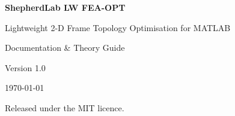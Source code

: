 \documentclass[11pt, a4paper]{report}
\begin{document}
\begin{titlepage}
    \centering
    \vspace*{3cm}
    {\Huge\bfseries ShepherdLab LW FEA-OPT\par}
    \vspace{0.5cm}
    {\Large Lightweight 2-D Frame Topology Optimisation for MATLAB\par}
    \vspace{2cm}
    {\large Documentation \& Theory Guide\par}
    \vspace{1cm}
    {\large Version 1.0\par}
    \vspace{3cm}
    {\large\today\par}
    \vfill
    {\small Released under the MIT licence.\par}
\end{titlepage}

\tableofcontents
\clearpage







\appendix

\end{document}
